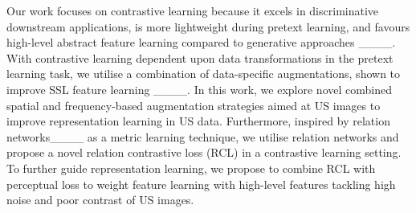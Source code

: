 

Our work focuses on contrastive learning because it excels in discriminative downstream applications, is more lightweight during pretext learning, and favours high-level abstract feature learning compared to generative approaches ____. With contrastive learning dependent upon data transformations in the pretext learning task, we utilise a combination of data-specific augmentations, shown to improve SSL feature learning ____. In this work, we explore novel combined spatial and frequency-based augmentation strategies aimed at US images to improve representation learning in US data. Furthermore, inspired by relation networks____ as a metric learning technique, we utilise relation networks and propose a novel relation contrastive loss (RCL) in a contrastive learning setting. To further guide representation learning, 
we propose to combine RCL with perceptual loss to weight feature learning with high-level features tackling high noise and poor contrast of US images. 
%
%
%
